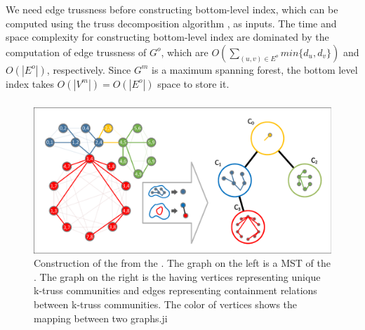 We need edge trussness before constructing bottom-level index, which can be computed using the truss decomposition algorithm \cite{wang2012truss}, as inputs. The time and space complexity for constructing bottom-level index are dominated by the computation of edge trussness of $G^o$, which are $O(\sum_{(u,v) \in E^{o}}{min\{d_{u},d_{v}\}})$ and $O(|E^{o}|)$,  respectively. Since $G^m$ is a maximum spanning forest, the bottom level index takes $O(|V^{m}|) = O(|E^{o}|)$ space to store it.

\subsubsection{\TreeIndex{}}
\label{top-level}

\begin{figure}[ht]
    \centering
    \includegraphics[width=0.8\linewidth, trim={0.1cm 0.1cm, 0.1cm, 0.1cm}, clip]{./figures/top_level.pdf}
    \caption{Construction of the \treeindex{} from the \inducedgraph{}. The graph on the left is a MST of the \inducedgraph{}. The graph on the right is the \treeindex{} having vertices representing unique k-truss communities and edges representing containment relations between k-truss communities. The color of vertices shows the mapping between two graphs.ji}
    \label{fig:top-level}
\end{figure}

